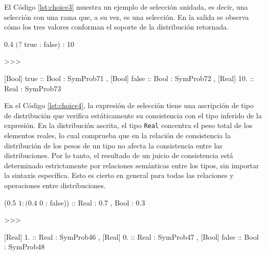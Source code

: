   

El Código \ref{lst:choice3} muestra un ejemplo de selección anidada,
es decir, una selección con una rama que, a su vez,
es una selección. En la salida se observa cómo los
tres valores conforman el soporte de la distribución
retornada.

\begin{gplcblock}[caption={Selección anidada},label={lst:choice3}]
0.4 $ (? $ true : false) : 10

>>>

{
	 [Bool] true :: Bool : SymProb71 ,
	 [Bool] false :: Bool : SymProb72 ,
	 [Real] 10. :: Real : SymProb73 
}  
\end{gplcblock}



En el Código \ref{lst:choice4}, la expresión de selección tiene una
ascripción de tipo de distribución que verifica estáticamente su
consistencia con el tipo inferido de la expresión. En la distribución
ascrita, el tipo \lstinline|Real| concentra el peso total de los
elementos reales, lo cual comprueba que en la relación de consistencia
la distribución de los pesos de un tipo no afecta la consistencia
entre las distribuciones. Por lo tanto, el resultado de un juicio de
consistencia está determinado estrictamente por relaciones semánticas
entre los tipos, sin importar la sintaxis específica. Esto es cierto
en general para todas las relaciones y operaciones entre
distribuciones.

\begin{gplcblock}[caption={Selección con ascripción},label={lst:choice4}]
(0.5 $ 1 : (0.4 $ 0 : false)) :: {Real : 0.7 , Bool : 0.3}

>>>

{
	 [Real] 1. :: Real : SymProb46 ,
	 [Real] 0. :: Real : SymProb47 ,
	 [Bool] false :: Bool : SymProb48 
}  
\end{gplcblock}
  
